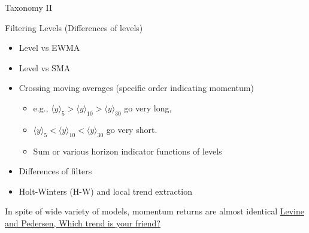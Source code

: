 \begin{frame}{Taxonomy II}
\begin{alertblock}{Filtering Levels (Differences of levels)}
\begin{itemize}

    \item Level vs EWMA
    \item Level vs SMA
    \item Crossing moving averages (specific order indicating momentum)
    \begin{itemize}

        \item e.g., $\langle y\rangle_5 >\langle y\rangle_{10}>  \langle y\rangle_{30}$ go very long,
        \item $\langle y\rangle_5 < \langle y\rangle_{10} < \langle y\rangle_{30}$ go very short.
        \item Sum or various horizon indicator functions of levels
        
    \end{itemize}        
    \item Differences of filters
    \item Holt-Winters (H-W) and local  trend extraction
\end{itemize}    

\end{alertblock}
In spite of wide variety of models, momentum returns are almost identical \href{http://papers.ssrn.com/sol3/papers.cfm?abstract_id=2603731}{Levine and Pedersen, Which trend is your friend?}
\end{frame}





